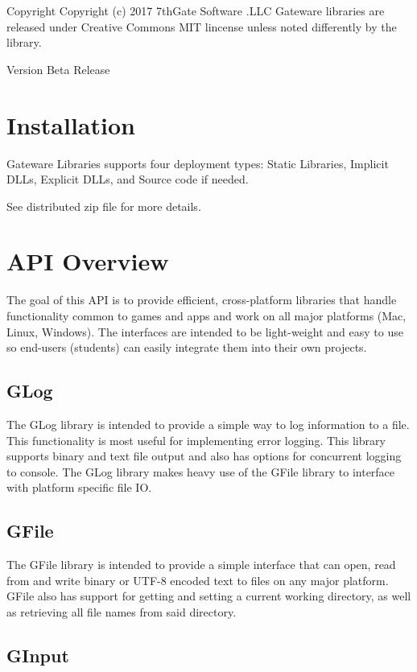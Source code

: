 \begin{DoxyCopyright}{Copyright}
Copyright (c) 2017 7th\+Gate Software .L\+LC  Gateware libraries are released under Creative Commons M\+IT lincense unless noted differently by the library. 
\end{DoxyCopyright}
\begin{DoxyVersion}{Version}
Beta Release
\end{DoxyVersion}
\hypertarget{index_Install}{}\section{Installation}\label{index_Install}
Gateware Libraries supports four deployment types\+: Static Libraries, Implicit D\+L\+Ls, Explicit D\+L\+Ls, and Source code if needed.

See distributed zip file for more details.\hypertarget{index_API}{}\section{A\+P\+I Overview}\label{index_API}
The goal of this A\+PI is to provide efficient, cross-\/platform libraries that handle functionality common to games and apps and work on all major platforms (Mac, Linux, Windows). The interfaces are intended to be light-\/weight and easy to use so end-\/users (students) can easily integrate them into their own projects.\hypertarget{index_APIGLog}{}\subsection{G\+Log}\label{index_APIGLog}
The G\+Log library is intended to provide a simple way to log information to a file. This functionality is most useful for implementing error logging. This library supports binary and text file output and also has options for concurrent logging to console. The G\+Log library makes heavy use of the G\+File library to interface with platform specific file IO.\hypertarget{index_APIGFile}{}\subsection{G\+File}\label{index_APIGFile}
The G\+File library is intended to provide a simple interface that can open, read from and write binary or U\+T\+F-\/8 encoded text to files on any major platform. G\+File also has support for getting and setting a current working directory, as well as retrieving all file names from said directory.\hypertarget{index_APIGInput}{}\subsection{G\+Input}\label{index_APIGInput}
